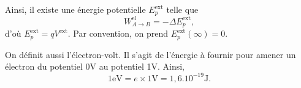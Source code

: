         Ainsi, il existe une énergie potentielle $E_{p}^{\text{ext}}$ telle que 
        \begin{equation}
            W_{A\to B}^{\text{el}}=-\Delta E_{p}^{\text{ext}},
        \end{equation}
        d'où $E_{p}^{\text{ext}}=qV^{\text{ext}}$. Par convention, on prend $E_p^{\text{ext}}(\infty)=0$.

        On définit aussi l'électron-volt. Il s'agit de l'énergie à fournir pour amener un électron du potentiel 0\si{\volt} au potentiel 1\si{\volt}. Ainsi, 
        \begin{equation}
            \boxed{
                1\si{\electronvolt}=e\times1\si{\volt}=1,6.10^{-19}\si{\joule}.
            }
        \end{equation}        